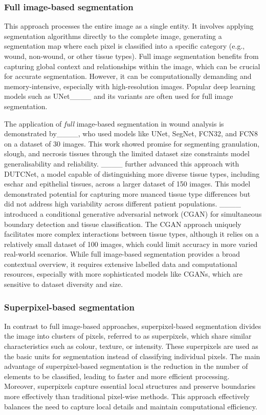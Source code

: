 \subsubsection{Full image-based segmentation} 
This approach processes the entire image as a single entity. It involves applying segmentation algorithms directly to the complete image, generating a segmentation map where each pixel is classified into a specific category (e.g., wound, non-wound, or other tissue types). Full image segmentation benefits from capturing global context and relationships within the image, which can be crucial for accurate segmentation. However, it can be computationally demanding and memory-intensive, especially with high-resolution images. Popular deep learning models such as UNet____ and its variants are often used for full image segmentation.

The application of \textit{full} image-based segmentation in wound analysis is demonstrated by____, who used models like UNet, SegNet, FCN32, and FCN8 on a dataset of 30 images. This work showed promise for segmenting granulation, slough, and necrosis tissues through the limited dataset size constraints model generalisability and reliability. ____ further advanced this approach with DUTCNet, a model capable of distinguishing more diverse tissue types, including eschar and epithelial tissues, across a larger dataset of 150 images. This model demonstrated potential for capturing more nuanced tissue type differences but did not address high variability across different patient populations.
____ introduced a conditional generative adversarial network (CGAN) for simultaneous boundary detection and tissue classification. The CGAN approach uniquely facilitates more complex interactions between tissue types, although it relies on a relatively small dataset of 100 images, which could limit accuracy in more varied real-world scenarios. While full image-based segmentation provides a broad contextual overview, it requires extensive labelled data and computational resources, especially with more sophisticated models like CGANs, which are sensitive to dataset diversity and size.

\subsubsection{Superpixel-based segmentation}
In contrast to full image-based approaches, superpixel-based segmentation divides the image into clusters of pixels, referred to as superpixels, which share similar characteristics such as colour, texture, or intensity. These superpixels are used as the basic units for segmentation instead of classifying individual pixels. The main advantage of superpixel-based segmentation is the reduction in the number of elements to be classified, leading to faster and more efficient processing. Moreover, superpixels capture essential local structures and preserve boundaries more effectively than traditional pixel-wise methods. This approach effectively balances the need to capture local details and maintain computational efficiency.

